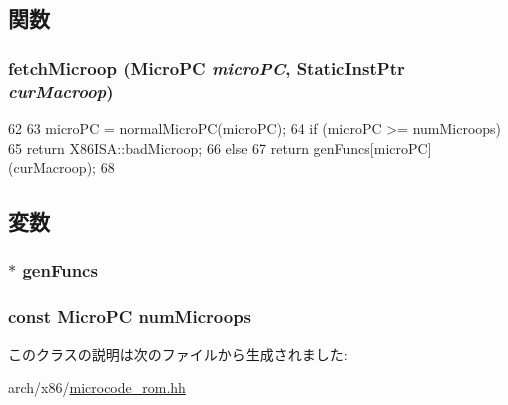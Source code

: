 \subsection{関数}
\hypertarget{classX86ISAInst_1_1MicrocodeRom_afea04fcbdb8244432c1bffdd8c5c097a}{
\subsubsection[{fetchMicroop}]{ fetchMicroop ({\bf MicroPC} {\em microPC}, \/  {\bf StaticInstPtr} {\em curMacroop})}}
\label{classX86ISAInst_1_1MicrocodeRom_afea04fcbdb8244432c1bffdd8c5c097a}



\begin{DoxyCode}
62         {
63             microPC = normalMicroPC(microPC);
64             if (microPC >= numMicroops)
65                 return X86ISA::badMicroop;
66             else
67                 return genFuncs[microPC](curMacroop);
68         }
\end{DoxyCode}


\subsection{変数}
\hypertarget{classX86ISAInst_1_1MicrocodeRom_a59ea86dd80d714d6ad4b9f60ee680077}{
\subsubsection[{genFuncs}]{$\ast$ {\bf genFuncs}}}
\label{classX86ISAInst_1_1MicrocodeRom_a59ea86dd80d714d6ad4b9f60ee680077}
\hypertarget{classX86ISAInst_1_1MicrocodeRom_a8861d37867bfca2ed636d382cff902f3}{
\subsubsection[{numMicroops}]{\setlength{\rightskip}{0pt plus 5cm}const {\bf MicroPC} {\bf numMicroops}}}
\label{classX86ISAInst_1_1MicrocodeRom_a8861d37867bfca2ed636d382cff902f3}


このクラスの説明は次のファイルから生成されました:\begin{DoxyCompactItemize}
\item 
arch/x86/\hyperlink{arch_2x86_2microcode__rom_8hh}{microcode\_\-rom.hh}\end{DoxyCompactItemize}
